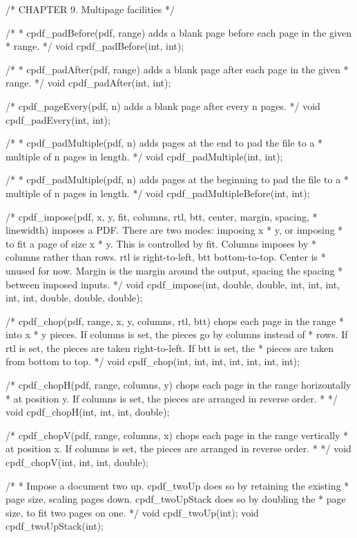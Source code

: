 /* CHAPTER 9. Multipage facilities */

/*
 * cpdf_padBefore(pdf, range) adds a blank page before each page in the given
 * range.
 */
void cpdf_padBefore(int, int);

/*
 * cpdf_padAfter(pdf, range) adds a blank page after each page in the given
 * range.
 */
void cpdf_padAfter(int, int);

/* cpdf_pageEvery(pdf, n) adds a blank page after every n pages. */
void cpdf_padEvery(int, int);

/*
 * cpdf_padMultiple(pdf, n) adds pages at the end to pad the file to a
 * multiple of n pages in length.
 */
void cpdf_padMultiple(int, int);

/*
 * cpdf_padMultiple(pdf, n) adds pages at the beginning to pad the file to a
 * multiple of n pages in length.
 */
void cpdf_padMultipleBefore(int, int);

/* cpdf_impose(pdf, x, y, fit, columns, rtl, btt, center, margin, spacing,
 * linewidth) imposes a PDF. There are two modes: imposing x * y, or imposing
 * to fit a page of size x * y. This is controlled by fit. Columns imposes by
 * columns rather than rows. rtl is right-to-left, btt bottom-to-top. Center is
 * unused for now. Margin is the margin around the output, spacing the spacing
 * between imposed inputs. */
void cpdf_impose(int, double, double, int, int, int, int, int, double, double,
                 double);

/* cpdf_chop(pdf, range, x, y, columns, rtl, btt) chops each page in the range
 * into x * y pieces. If columns is set, the pieces go by columns instead of
 * rows. If rtl is set, the pieces are taken right-to-left. If btt is set, the
 * pieces are taken from bottom to top. */
void cpdf_chop(int, int, int, int, int, int, int);

/* cpdf_chopH(pdf, range, columns, y) chops each page in the range horizontally
 * at position y. If columns is set, the pieces are arranged in reverse order.
 * */
void cpdf_chopH(int, int, int, double);

/* cpdf_chopV(pdf, range, columns, x) chops each page in the range vertically
 * at position x. If columns is set, the pieces are arranged in reverse order.
 * */
void cpdf_chopV(int, int, int, double);

/*
 * Impose a document two up. cpdf_twoUp does so by retaining the existing
 * page size, scaling pages down. cpdf_twoUpStack does so by doubling the
 * page size, to fit two pages on one.
 */
void cpdf_twoUp(int);
void cpdf_twoUpStack(int);

